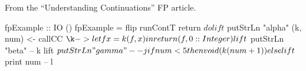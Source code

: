 \documentclass[ignorenonframetext,]{beamer}
\begin{document}
\begin{frame}[fragile]

From the ``Understanding Continuations'' FP article.

\begin{haskellcode}
fpExample :: IO ()
fpExample = flip runContT return $ do
    lift $ putStrLn "alpha"
    (k, num) <- callCC $ \k -> let f x = k (f, x)
                               in return (f, 0 :: Integer)
    lift $ putStrLn "beta"          -- k
    lift $ putStrLn "gamma"         -- j
    if num < 5
        then void (k (num + 1))
        else lift $ print num       -- l
\end{haskellcode}

\end{frame}
\end{document}
